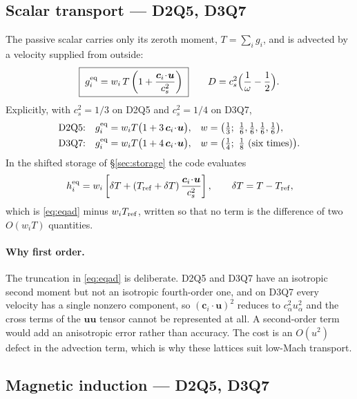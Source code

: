 \documentclass[11pt,a4paper]{article}
\newcommand{\cs}{c_s}
\newcommand{\ci}{\bm{c}_i}
\newcommand{\uu}{\bm{u}}
\begin{document}
\subsection{Scalar transport --- D2Q5, D3Q7}
\label{sec:eqscalar}

The passive scalar carries only its zeroth moment, $T=\sum_i g_i$, and is
advected by a velocity supplied from outside:
\begin{equation}
  \boxed{\; g_i^{\rm eq} = w_i\,T\left(1+\frac{\ci\!\cdot\!\uu}{\cs^2}\right)\;}
  \qquad
  D = \cs^2\Big(\frac{1}{\omega}-\frac12\Big).
  \label{eq:eqad}
\end{equation}
Explicitly, with $\cs^2=1/3$ on D2Q5 and $\cs^2=1/4$ on D3Q7,
\begin{align}
  \text{D2Q5:}&\quad g_i^{\rm eq} = w_i T\big(1+3\,\ci\!\cdot\!\uu\big),
     & w &= \big(\tfrac13;\ \tfrac16,\tfrac16,\tfrac16,\tfrac16\big), \\
  \text{D3Q7:}&\quad g_i^{\rm eq} = w_i T\big(1+4\,\ci\!\cdot\!\uu\big),
     & w &= \big(\tfrac14;\ \tfrac18\ \text{(six times)}\big).
\end{align}
In the shifted storage of \S\ref{sec:storage} the code evaluates
\begin{equation}
  h_i^{\rm eq} = w_i\left[\delta T + (T_{\rm ref}+\delta T)\,
    \frac{\ci\!\cdot\!\uu}{\cs^2}\right], \qquad \delta T = T-T_{\rm ref},
\end{equation}
which is \eqref{eq:eqad} minus $w_iT_{\rm ref}$, written so that no term is the
difference of two $O(w_iT)$ quantities.

\paragraph{Why first order.} The truncation in \eqref{eq:eqad} is deliberate.
D2Q5 and D3Q7 have an isotropic second moment but not an isotropic fourth-order
one, and on D3Q7 every velocity has a single nonzero component, so
$(\ci\!\cdot\!\uu)^2$ reduces to $c_\alpha^2u_\alpha^2$ and the cross terms of the
$\uu\uu$ tensor cannot be represented at all. A second-order term would add an
anisotropic error rather than accuracy. The cost is an $O(u^2)$ defect in the
advection term, which is why these lattices suit low-Mach transport.

\subsection{Magnetic induction --- D2Q5, D3Q7}
\label{sec:eqmag}
\end{document}
